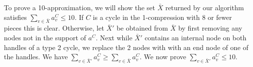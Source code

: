 \documentclass{article}
\newcommand{\0}{\mathbb{0}}
\newcommand{\1}{\mathbb{1}}
\begin{document}
To prove a 10-approximation, we will show the set $\bar{X}$ returned by our algorithm satisfies $\sum_{v\in \bar{X}} a_v^C  \leq 10 $. If $C$ is a cycle in the 1-compression with 8 or fewer pieces this is clear.  Otherwise, let $\bar{X}'$ be obtained from $\bar{X}$ by first removing any nodes not in the support of $a^C$.  Next while $ \bar{X}'$ contains  an internal node on both handles of a type 2 cycle, we replace the 2 nodes with with an end node of one of the handles.  We have $\sum_{v\in \bar{X}'} a_v^C \geq \sum_{v \in \bar{X}} a_v^C$. We now prove $\sum_{v\in \bar{X}'} a_v^C \leq 10$.
\end{document}
